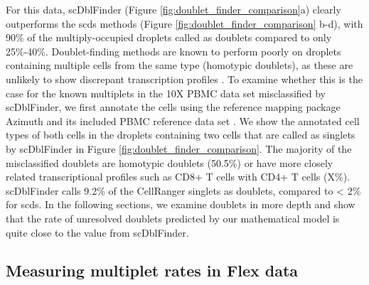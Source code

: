 \documentclass[unnumsec,webpdf,modern,large]{oup-authoring-template}
\begin{document}
	For this data, scDblFinder (Figure \ref{fig:doublet_finder_comparison}a) clearly outperforms the scds methods (Figure \ref{fig:doublet_finder_comparison} b-d), with 90\% of the multiply-occupied droplets called as doublets compared to only 25\%-40\%. 
	Doublet-finding methods are known to perform poorly on droplets containing multiple cells from the same type (homotypic doublets), as these are unlikely to show discrepant transcription profiles
	\citep{Xiong2022, Neavin2024}.
	To examine whether this is the case for the known multiplets in the 10X PBMC data set misclassified by scDblFinder, we first annotate the cells using the reference mapping package Azimuth and its included PBMC reference data set 
	\citep{Hao2021}. 
	We show the annotated cell types of both cells in the droplets containing two cells that are called as singlets by scDblFinder in Figure \ref{fig:doublet_finder_comparison}.	
	The majority of the misclassified doublets are homotypic doublets (50.5\%) or have more closely related transcriptional profiles such as CD8+ T cells with CD4+ T cells (X\%).
	scDblFinder calls 9.2\% of the CellRanger singlets as doublets, compared to < 2\% for scds. 
	In the following sections, we examine doublets in more depth and show that the rate of unresolved doublets predicted by our mathematical model is quite close to the value from scDblFinder.
	
	\subsection{Measuring multiplet rates in Flex data}
	
\end{document}

